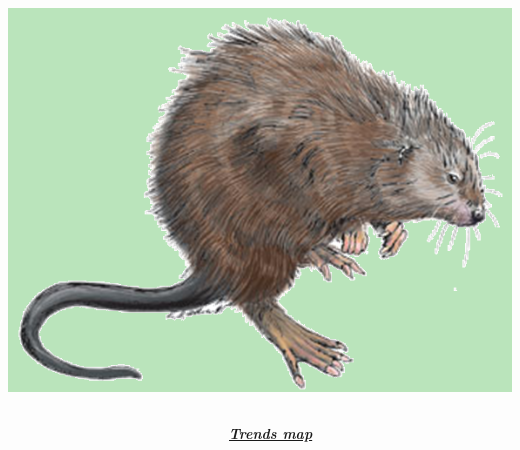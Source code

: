 \documentclass[serif]{beamer}\usepackage[]{graphicx}\usepackage[]{color}
\newcommand{\Bigtxt}[1]{\textbf{\textit{#1}}}
\begin{document}
\begin{frame}[fragile]{\includegraphics[width=0.05\paperwidth]{fig/muskrat.png}\hspace{0.07in}{\bf SWMPrats.net: Widgets}}
\begin{columns}[t]
\begin{column}{0.45\textwidth}
\end{column}
\begin{column}{0.45\textwidth}
\centerline{\Bigtxt{\href{https://beckmw.shinyapps.io/swmp_comp}{Trends map}}}
\centerline{}
\end{column}
\end{columns}
\end{frame}
\end{document}
